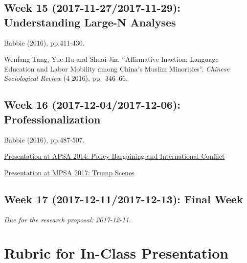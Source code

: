 \documentclass[11pt,]{article}
\theoremstyle{definition}
\theoremstyle{definition}
\theoremstyle{definition}
\theoremstyle{remark}
\begin{document}
\subsection{Week 15 (2017-11-27/2017-11-29): Understanding Large-N
Analyses}\label{week-15-2017-11-272017-11-29-understanding-large-n-analyses}

Babbie (2016), pp.411-430.

Wenfang Tang, Yue Hu and Shuai Jin. ``Affirmative Inaction: Language
Education and Labor Mobility among China's Muslim Minorities''.
\emph{Chinese Sociological Review} (4 2016), pp.~346--66.

\subsection{Week 16 (2017-12-04/2017-12-06):
Professionalization}\label{week-16-2017-12-042017-12-06-professionalization}

Babbie (2016), pp.487-507.

\href{https://www.youtube.com/watch?v=bwNBXuz2eRg}{Presentation at APSA
2014: Policy Bargaining and International Conflict}

\href{https://www.youtube.com/watch?v=Z4ISkF2H4tk}{Presentation at MPSA
2017: Trump Scenes}

\subsection{Week 17 (2017-12-11/2017-12-13): Final
Week}\label{week-17-2017-12-112017-12-13-final-week}

\emph{Due for the research proposal: 2017-12-11.}

\clearpage

\hypertarget{id}{\section{Rubric for In-Class Presentation}\label{id}}
\end{document}
